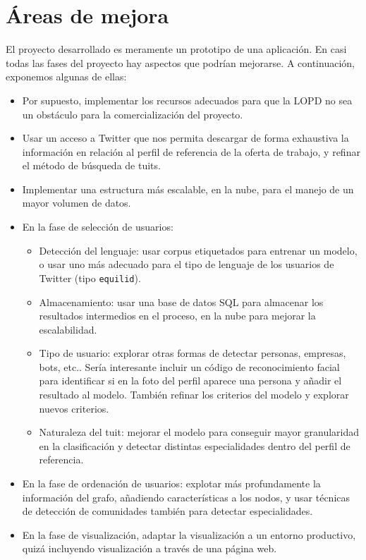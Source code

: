 \chapter{\'Areas de mejora}

El proyecto desarrollado es meramente un prototipo de una aplicación.
En casi todas las fases del proyecto hay aspectos que podrían
mejorarse. A continuación, exponemos algunas de ellas:
\begin{itemize} 
\item Por supuesto, implementar los recursos adecuados para que la 
LOPD no sea un obstáculo para la comercialización del proyecto.
\item Usar un acceso a Twitter que nos permita descargar de forma exhaustiva
la información en relación al perfil de referencia de la oferta de trabajo,
y refinar el método de búsqueda de tuits.
\item Implementar una estructura más escalable, en la nube,
para el manejo de un mayor volumen de datos.
\item En la fase de selección de usuarios:
\begin{itemize}
\item Detección del lenguaje: usar corpus etiquetados para entrenar un modelo,
o usar uno más adecuado para el tipo de lenguaje de los usuarios de Twitter 
(tipo {\tt equilid}).
\item Almacenamiento: usar una base de datos SQL para almacenar los resultados 
intermedios en el proceso, en la nube para mejorar la escalabilidad.
\item Tipo de usuario: explorar otras formas de detectar personas, empresas, bots, etc.. 
Sería interesante incluir un código de reconocimiento facial para identificar si en la foto 
del perfil aparece una persona y añadir el resultado al modelo. También refinar los 
criterios del modelo y explorar nuevos criterios.
\item Naturaleza del tuit: mejorar el modelo para conseguir mayor granularidad en
la clasificación y detectar distintas especialidades dentro del perfil de referencia.
\end{itemize} 
\item En la fase de ordenación de usuarios: explotar más profundamente la información
del grafo, añadiendo características a los nodos, y usar técnicas de detección de comunidades
también para detectar especialidades.
\item En la fase de visualización, adaptar la visualización a un entorno productivo,
quizá incluyendo visualización a través de una página web.

\end{itemize}
